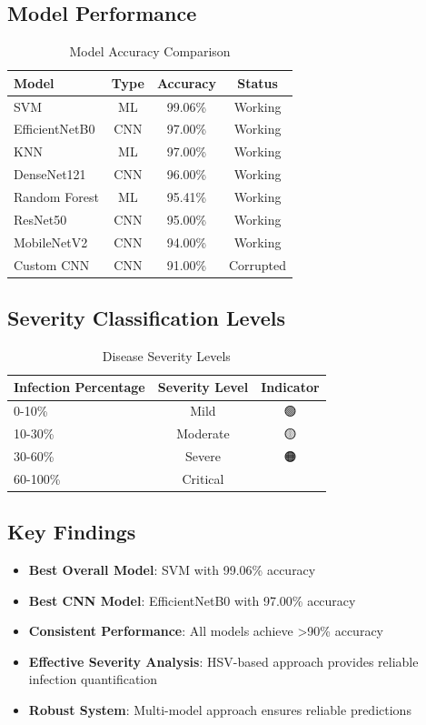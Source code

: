 \documentclass[11pt,a4paper]{article}
\begin{document}
\subsection{Model Performance}
\begin{table}[h]
\centering
\caption{Model Accuracy Comparison}
\begin{tabular}{lccc}
\toprule
\textbf{Model} & \textbf{Type} & \textbf{Accuracy} & \textbf{Status} \\
\midrule
SVM & ML & 99.06\% & Working \\
EfficientNetB0 & CNN & 97.00\% & Working \\
KNN & ML & 97.00\% & Working \\
DenseNet121 & CNN & 96.00\% & Working \\
Random Forest & ML & 95.41\% & Working \\
ResNet50 & CNN & 95.00\% & Working \\
MobileNetV2 & CNN & 94.00\% & Working \\
Custom CNN & CNN & 91.00\% & Corrupted \\
\bottomrule
\end{tabular}
\end{table}

\subsection{Severity Classification Levels}
\begin{table}[h]
\centering
\caption{Disease Severity Levels}
\begin{tabular}{lcc}
\toprule
\textbf{Infection Percentage} & \textbf{Severity Level} & \textbf{Indicator} \\
\midrule
0-10\% & Mild & 🟢 \\
10-30\% & Moderate & 🟡 \\
30-60\% & Severe & 🟠 \\
60-100\% & Critical & 🔴 \\
\bottomrule
\end{tabular}
\end{table}

\subsection{Key Findings}
\begin{itemize}
    \item \textbf{Best Overall Model}: SVM with 99.06\% accuracy
    \item \textbf{Best CNN Model}: EfficientNetB0 with 97.00\% accuracy
    \item \textbf{Consistent Performance}: All models achieve >90\% accuracy
    \item \textbf{Effective Severity Analysis}: HSV-based approach provides reliable infection quantification
    \item \textbf{Robust System}: Multi-model approach ensures reliable predictions
\end{itemize}
\end{document}
